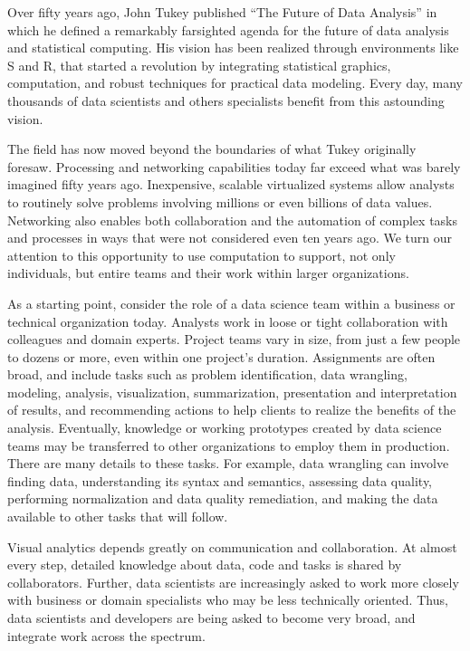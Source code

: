 
\maketitle

Over fifty years ago, John Tukey published ``The Future of Data Analysis''
in which he defined a remarkably farsighted agenda for the future of
data analysis and statistical computing. His vision has been realized
through environments like S and R, that started a revolution by
integrating statistical graphics, computation, and robust techniques
for practical data modeling. Every day, many thousands of data scientists
and others specialists benefit from this astounding vision.

The field has now moved beyond the boundaries of what Tukey originally
foresaw. Processing and networking capabilities today far exceed
what was barely imagined fifty years ago. Inexpensive, scalable
virtualized systems allow analysts to routinely solve problems
involving millions or even billions of data values. Networking
also enables both collaboration and the automation of complex
tasks and processes in ways that were not considered even ten years ago.
We turn our attention to this opportunity to use computation
to support, not only individuals, but entire teams and their
work within larger organizations.

As a starting point, consider the role of a data science team within
a business or technical organization today.
Analysts work in loose or tight collaboration with colleagues and
domain experts.
Project teams vary in size, from just a few people to dozens or
more, even within one project's duration. Assignments are often
broad, and include tasks such as problem identification,
data wrangling, modeling, analysis, visualization, summarization,
presentation and interpretation of results, and recommending
actions to help clients to realize the benefits of the analysis.
Eventually, knowledge or working prototypes created by data science teams
may be transferred to other organizations to employ them in production.
There are many details to these tasks. For example, data wrangling can involve
finding data, understanding its syntax and semantics, assessing data quality,
performing normalization and data quality remediation, and making the data
available to other tasks that will follow.

Visual analytics depends greatly on communication and collaboration.
At almost every step, detailed knowledge about data, code and tasks
is shared by collaborators. 
Further, data scientists are increasingly asked to work more closely
with business or domain specialists who may be less technically oriented.
Thus, data scientists and developers are being asked to become
very broad, and integrate work across the spectrum.

